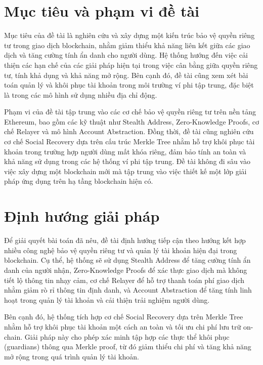 \documentclass[../DoAn.tex]{subfiles}
\begin{document}
\section{Mục tiêu và phạm vi đề tài}
\label{section:1.2}

Mục tiêu của đề tài là nghiên cứu và xây dựng một kiến trúc bảo vệ quyền riêng tư trong giao dịch blockchain, nhằm giảm thiểu khả năng liên kết giữa các giao dịch và tăng cường tính ẩn danh cho người dùng. Hệ thống hướng đến việc cải thiện các hạn chế của các giải pháp hiện tại trong việc cân bằng giữa quyền riêng tư, tính khả dụng và khả năng mở rộng. Bên cạnh đó, đề tài cũng xem xét bài toán quản lý và khôi phục tài khoản trong môi trường ví phi tập trung, đặc biệt là trong các mô hình sử dụng nhiều địa chỉ động.

Phạm vi của đề tài tập trung vào các cơ chế bảo vệ quyền riêng tư trên nền tảng Ethereum, bao gồm các kỹ thuật như Stealth Address, Zero-Knowledge Proofs, cơ chế Relayer và mô hình Account Abstraction. Đồng thời, đề tài cũng nghiên cứu cơ chế Social Recovery dựa trên cấu trúc Merkle Tree nhằm hỗ trợ khôi phục tài khoản trong trường hợp người dùng mất khóa riêng, đảm bảo tính an toàn và khả năng sử dụng trong các hệ thống ví phi tập trung. Đề tài không đi sâu vào việc xây dựng một blockchain mới mà tập trung vào việc thiết kế một lớp giải pháp ứng dụng trên hạ tầng blockchain hiện có.
\section{Định hướng giải pháp}
\label{section:1.3}

Để giải quyết bài toán đã nêu, đề tài định hướng tiếp cận theo hướng kết hợp nhiều công nghệ bảo vệ quyền riêng tư và quản lý tài khoản hiện đại trong blockchain. Cụ thể, hệ thống sẽ sử dụng Stealth Address để tăng cường tính ẩn danh của người nhận, Zero-Knowledge Proofs để xác thực giao dịch mà không tiết lộ thông tin nhạy cảm, cơ chế Relayer để hỗ trợ thanh toán phí giao dịch nhằm giảm rò rỉ thông tin định danh, và Account Abstraction để tăng tính linh hoạt trong quản lý tài khoản và cải thiện trải nghiệm người dùng.

Bên cạnh đó, hệ thống tích hợp cơ chế Social Recovery dựa trên Merkle Tree nhằm hỗ trợ khôi phục tài khoản một cách an toàn và tối ưu chi phí lưu trữ on-chain. Giải pháp này cho phép xác minh tập hợp các thực thể khôi phục (guardians) thông qua Merkle proof, từ đó giảm thiểu chi phí và tăng khả năng mở rộng trong quá trình quản lý tài khoản.
\end{document}
